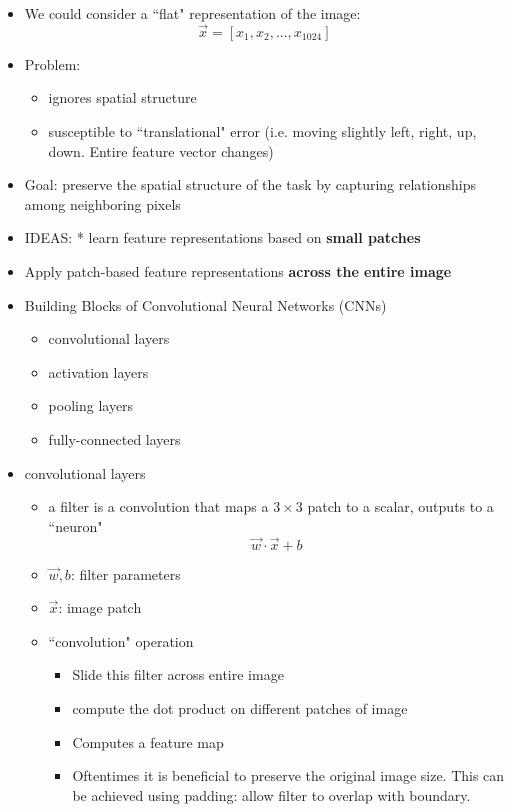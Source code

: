 \documentclass[10pt, oneside]{article}
\begin{document}
\begin{itemize}
    \item We could consider a ``flat" representation of the image:\[\vec x = [x_1, x_2, ..., x_{1024}]\]
    \item Problem:
    \begin{itemize}
        \item ignores spatial structure
        \item susceptible to ``translational" error (i.e. moving slightly left, right, up, down. Entire feature vector changes)
    \end{itemize}
    \item Goal: preserve the spatial structure of the task by capturing relationships among neighboring pixels
    \item IDEAS: * learn feature representations based on \textbf{small patches}
    \item Apply patch-based feature representations \textbf{across the entire image}
    \item Building Blocks of Convolutional Neural Networks (CNNs)
    \begin{itemize}
        \item convolutional layers
        \item activation layers
        \item pooling layers
        \item fully-connected layers
    \end{itemize}
    \item convolutional layers
    \begin{itemize}
        \item a filter is a convolution that maps a $3\times 3$ patch to a scalar, outputs to a ``neuron"
        \[\vec w \cdot \vec x + b\]
        \item $\vec w, b$: filter parameters
        \item $\vec x$: image patch
        \item ``convolution" operation
        \begin{itemize}
            \item Slide this filter across entire image
            \item compute the dot product on different patches of image
            \item Computes a feature map
            \item Oftentimes it is beneficial to preserve the original image size. This can be achieved using padding: allow filter to overlap with boundary.

\end{itemize}
\end{itemize}
\end{itemize}
\end{document}
